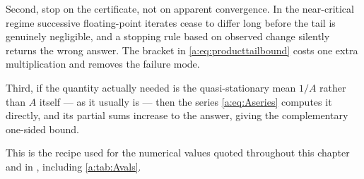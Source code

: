 Second, stop on the certificate, not on apparent convergence. In the near-critical
regime successive floating-point iterates cease to differ long before the tail is
genuinely negligible, and a stopping rule based on observed change silently returns
the wrong answer. The bracket in \cref{a:eq:producttailbound} costs one extra
multiplication and removes the failure mode.

Third, if the quantity actually needed is the quasi-stationary mean $1/A$ rather
than $A$ itself --- as it usually is --- then the series \cref{a:eq:Aseries}
computes it directly, and its partial sums increase to the answer, giving the
complementary one-sided bound.

This is the recipe used for the numerical values quoted throughout this chapter
and in \ChM, including \cref{a:tab:Avals}.

